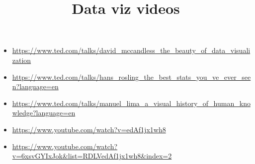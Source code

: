\documentclass{article}
\title{Data viz videos}
\begin{document}
\maketitle
\begin{itemize}
\item\url{https://www.ted.com/talks/david_mccandless_the_beauty_of_data_visualization}
\item\url{https://www.ted.com/talks/hans_rosling_the_best_stats_you_ve_ever_seen?language=en}
\item\url{https://www.ted.com/talks/manuel_lima_a_visual_history_of_human_knowledge?language=en}
\item\url{https://www.youtube.com/watch?v=edAf1jx1wh8}
\item\url{https://www.youtube.com/watch?v=6xsvGYIxJok&list=RDLVedAf1jx1wh8&index=2}
\end{itemize}
\end{document}
